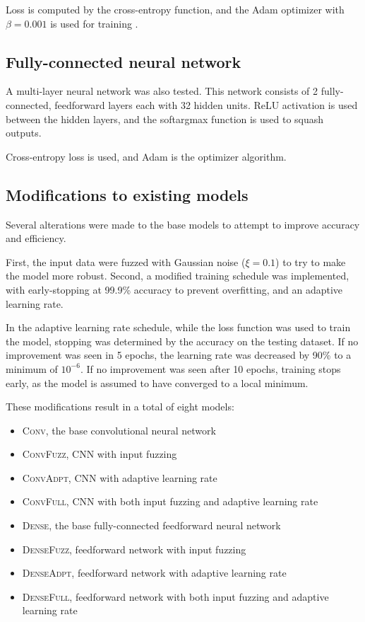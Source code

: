 \documentclass{article}
\begin{document}
Loss is computed by the cross-entropy function, and the Adam optimizer with $\beta = 0.001$
is used for training \citep{kingmaAdamMethodStochastic2017}.

\subsection{Fully-connected neural network}

A multi-layer neural network was also tested.
This network consists of 2 fully-connected, feedforward layers each with 32 hidden units.
ReLU activation is used between the hidden layers,
and the softargmax function is used to squash outputs.

Cross-entropy loss is used, and Adam is the optimizer algorithm.

\subsection{Modifications to existing models}

Several alterations were made to the base models to attempt to improve accuracy and efficiency.

First, the input data were fuzzed with Gaussian noise ($\xi = 0.1$)
to try to make the model more robust.
Second, a modified training schedule was implemented,
with early-stopping at 99.9\% accuracy to prevent overfitting,
and an adaptive learning rate.

In the adaptive learning rate schedule,
while the loss function was used to train the model,
stopping was determined by the accuracy on the testing dataset.
If no improvement was seen in 5 epochs, the learning rate was decreased by 90\%
to a minimum of $10^{-6}$.
If no improvement was seen after 10 epochs, training stops early,
as the model is assumed to have converged to a local minimum.

These modifications result in a total of eight models:

\begin{itemize}
  \item \textsc{Conv}, the base convolutional neural network
  \item \textsc{ConvFuzz}, CNN with input fuzzing
  \item \textsc{ConvAdpt}, CNN with adaptive learning rate
  \item \textsc{ConvFull}, CNN with both input fuzzing and adaptive learning rate
  \item \textsc{Dense}, the base fully-connected feedforward neural network
  \item \textsc{DenseFuzz}, feedforward network with input fuzzing
  \item \textsc{DenseAdpt}, feedforward network with adaptive learning rate
  \item \textsc{DenseFull}, feedforward network with both input fuzzing and adaptive learning rate
\end{itemize}
\end{document}
